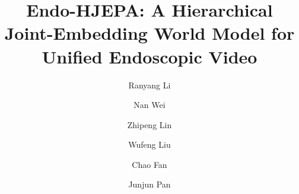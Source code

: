 \documentclass[final,3p,times,twocolumn]{elsarticle}
\begin{document}
\begin{frontmatter}

\title{Endo-HJEPA: A Hierarchical Joint-Embedding World Model for Unified Endoscopic Video}

\author[haut]{Ranyang Li}
\author[hpp]{Nan Wei}
\author[buaa]{Zhipeng Lin}
\author[haut]{Wufeng Liu}
\author[haut]{Chao Fan}
\author[buaa]{Junjun Pan}

\address[haut]{School of Artificial Intelligence and Big Data, Henan University of Technology, Zhengzhou 450001, China}
\address[hpp]{Henan Provincial People's Hospital, Zhengzhou 450003, China}
\address[buaa]{School of Computer Science and Engineering, Beihang University, Beijing 100191, China}


\end{frontmatter}
\end{document}
